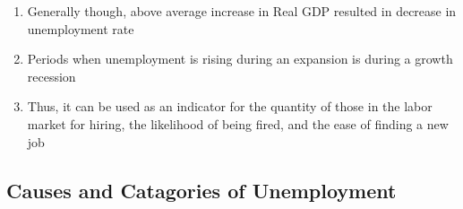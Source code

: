 \documentclass[11 pt, twoside]{article}
\begin{document}
\begin{enumerate}
\begin{enumerate}
\item Generally though, above average increase in Real GDP resulted in decrease in unemployment rate
\item Periods when unemployment is rising during an expansion is during a growth recession
\item Thus, it can be used as an indicator for the quantity of those in the labor market for hiring, the likelihood of being fired, and the ease of finding a new job
\end{enumerate}
\end{enumerate}

\subsection{Causes and Catagories of Unemployment}
\end{document}
